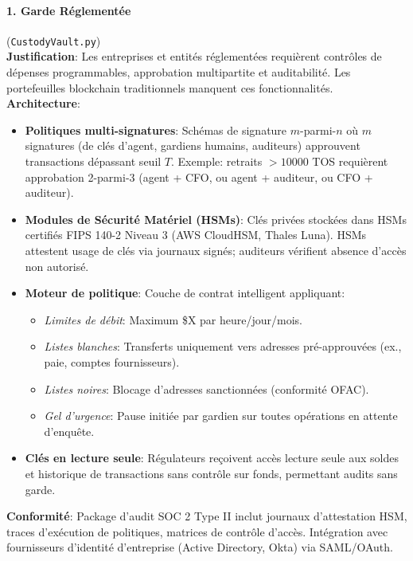 \documentclass[11pt]{article}
\begin{document}
\paragraph{1. Garde Réglementée} (\texttt{CustodyVault.py})\\
\textbf{Justification}: Les entreprises et entités réglementées requièrent contrôles de dépenses programmables, approbation multipartite et auditabilité. Les portefeuilles blockchain traditionnels manquent ces fonctionnalités.\\
\textbf{Architecture}:
\begin{itemize}[noitemsep]
  \item \textbf{Politiques multi-signatures}: Schémas de signature $m$-parmi-$n$ où $m$ signatures (de clés d'agent, gardiens humains, auditeurs) approuvent transactions dépassant seuil $T$. Exemple: retraits $>10 000$ TOS requièrent approbation 2-parmi-3 (agent + CFO, ou agent + auditeur, ou CFO + auditeur).
  \item \textbf{Modules de Sécurité Matériel (HSMs)}: Clés privées stockées dans HSMs certifiés FIPS 140-2 Niveau 3 (AWS CloudHSM, Thales Luna). HSMs attestent usage de clés via journaux signés; auditeurs vérifient absence d'accès non autorisé.
  \item \textbf{Moteur de politique}: Couche de contrat intelligent appliquant:
    \begin{itemize}[noitemsep]
      \item \emph{Limites de débit}: Maximum \$X par heure/jour/mois.
      \item \emph{Listes blanches}: Transferts uniquement vers adresses pré-approuvées (ex., paie, comptes fournisseurs).
      \item \emph{Listes noires}: Blocage d'adresses sanctionnées (conformité OFAC).
      \item \emph{Gel d'urgence}: Pause initiée par gardien sur toutes opérations en attente d'enquête.
    \end{itemize}
  \item \textbf{Clés en lecture seule}: Régulateurs reçoivent accès lecture seule aux soldes et historique de transactions sans contrôle sur fonds, permettant audits sans garde.
\end{itemize}
\textbf{Conformité}: Package d'audit SOC 2 Type II inclut journaux d'attestation HSM, traces d'exécution de politiques, matrices de contrôle d'accès. Intégration avec fournisseurs d'identité d'entreprise (Active Directory, Okta) via SAML/OAuth.
\end{document}

